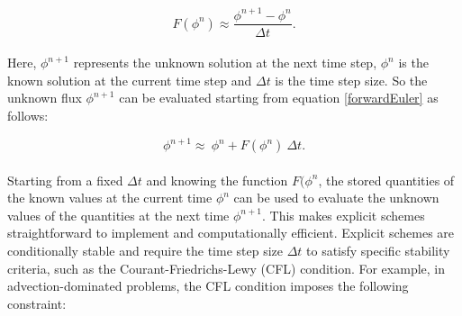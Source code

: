 \documentclass[a5paper]{sapthesis}
\begin{document}
	\begin{equation}
	 F(\phi^n) \approx \dfrac{\phi^{n+1} - \phi^n}{\Delta t}.
	\label{forwardEuler}
	\end{equation}
	\\
	Here, $\phi^{n+1}$ represents the unknown solution at the next time step, $\phi^n$ is the known solution at the current time step and $\Delta t$ is the time step size.
	So the unknown flux $\phi^{n+1}$ can be evaluated starting from equation \ref{forwardEuler} as follows:
	
	\begin{equation}
		\phi^{n+1} \approx \ \phi^n + F(\phi^n) \ \Delta t.
		\label{forwardEuler1}
	\end{equation}
	\\
	Starting from a fixed $\Delta t$ and knowing the function $F(\phi^n$, the stored quantities of the known values at the current time $\phi^n$ can be used to evaluate the unknown values of the quantities at the next time $\phi^{n+1}$. This makes explicit schemes straightforward to implement and computationally efficient.
	Explicit schemes are conditionally stable and require the time step size $\Delta t$ to satisfy specific stability criteria, such as the Courant-Friedrichs-Lewy (CFL) condition. For example, in advection-dominated problems, the CFL condition imposes the following constraint:
	
\end{document}
